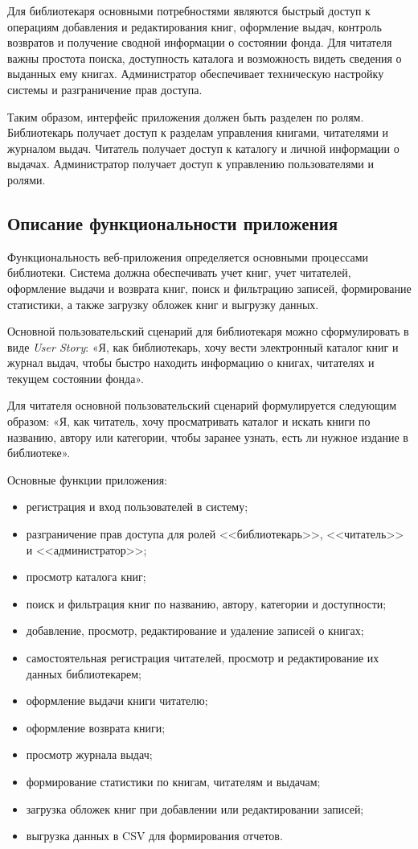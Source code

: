 Для библиотекаря основными потребностями являются быстрый доступ к операциям
добавления и редактирования книг, оформление выдач, контроль возвратов и получение
сводной информации о состоянии фонда. Для читателя важны простота поиска,
доступность каталога и возможность видеть сведения о выданных ему книгах.
Администратор обеспечивает техническую настройку системы и разграничение прав
доступа.

Таким образом, интерфейс приложения должен быть разделен по ролям. Библиотекарь
получает доступ к разделам управления книгами, читателями и журналом выдач.
Читатель получает доступ к каталогу и личной информации о выдачах. Администратор
получает доступ к управлению пользователями и ролями.

\subsection{Описание функциональности приложения}

Функциональность веб-приложения определяется основными процессами библиотеки.
Система должна обеспечивать учет книг, учет читателей, оформление выдачи и
возврата книг, поиск и фильтрацию записей, формирование статистики, а также
загрузку обложек книг и выгрузку данных.

Основной пользовательский сценарий для библиотекаря можно сформулировать в виде
\textit{User Story}: «Я, как библиотекарь, хочу вести электронный каталог книг и
журнал выдач, чтобы быстро находить информацию о книгах, читателях и текущем
состоянии фонда».

Для читателя основной пользовательский сценарий формулируется следующим образом:
«Я, как читатель, хочу просматривать каталог и искать книги по названию, автору
или категории, чтобы заранее узнать, есть ли нужное издание в библиотеке».

Основные функции приложения:

\begin{itemize}
    \item регистрация и вход пользователей в систему;
    \item разграничение прав доступа для ролей <<библиотекарь>>, <<читатель>> и
          <<администратор>>;
    \item просмотр каталога книг;
    \item поиск и фильтрация книг по названию, автору, категории и доступности;
    \item добавление, просмотр, редактирование и удаление записей о книгах;
    \item самостоятельная регистрация читателей, просмотр и редактирование их данных библиотекарем;
    \item оформление выдачи книги читателю;
    \item оформление возврата книги;
    \item просмотр журнала выдач;
    \item формирование статистики по книгам, читателям и выдачам;
    \item загрузка обложек книг при добавлении или редактировании записей;
    \item выгрузка данных в CSV для формирования отчетов.
\end{itemize}

